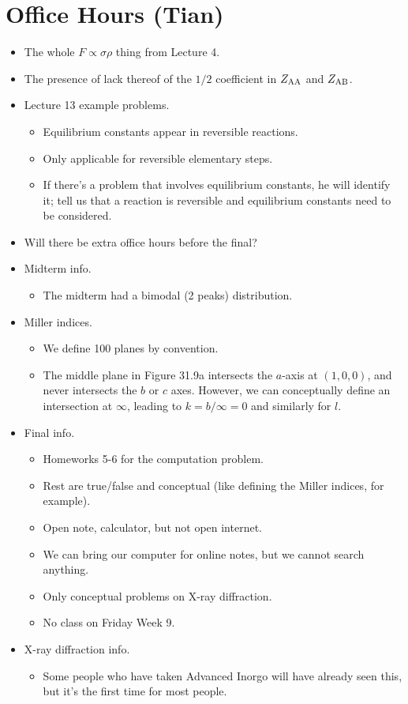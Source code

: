 \documentclass[../notes.tex]{subfiles}
\begin{document}
\section{Office Hours (Tian)}
\begin{itemize}
    \item The whole $F\propto\sigma\rho$ thing from Lecture 4.
    \item The presence of lack thereof of the $1/2$ coefficient in $Z_{\ce{A}\ce{A}}$ and $Z_{\ce{A}\ce{B}}$.
    \item Lecture 13 example problems.
    \begin{itemize}
        \item Equilibrium constants appear in reversible reactions.
        \item Only applicable for reversible elementary steps.
        \item If there's a problem that involves equilibrium constants, he will identify it; tell us that a reaction is reversible and equilibrium constants need to be considered.
    \end{itemize}
    \item Will there be extra office hours before the final?
    \item Midterm info.
    \begin{itemize}
        \item The midterm had a bimodal (2 peaks) distribution.
    \end{itemize}
    \item Miller indices.
    \begin{itemize}
        \item We define 100 planes by convention.
        \item The middle plane in Figure 31.9a intersects the $a$-axis at $(1,0,0)$, and never intersects the $b$ or $c$ axes. However, we can conceptually define an intersection at $\infty$, leading to $k=b/\infty=0$ and similarly for $l$.
    \end{itemize}
    \item Final info.
    \begin{itemize}
        \item Homeworks 5-6 for the computation problem.
        \item Rest are true/false and conceptual (like defining the Miller indices, for example).
        \item Open note, calculator, but not open internet.
        \item We can bring our computer for online notes, but we cannot search anything.
        \item Only conceptual problems on X-ray diffraction.
        \item No class on Friday Week 9.
    \end{itemize}
    \item X-ray diffraction info.
    \begin{itemize}
        \item Some people who have taken Advanced Inorgo will have already seen this, but it's the first time for most people.
    \end{itemize}
\end{itemize}
\end{document}
